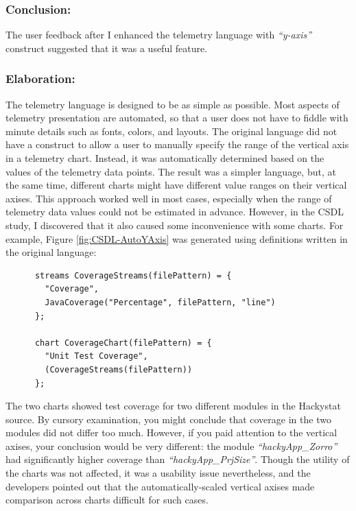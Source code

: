 \subsubsection{Conclusion:}

The user feedback after I enhanced the telemetry language with \textit{``y-axis''} construct suggested that it was a useful feature.

\subsubsection{Elaboration:}


The telemetry language is designed to be as simple as possible. Most aspects of telemetry presentation are automated, so that a user does not have to fiddle with minute details such as fonts, colors, and layouts. The original language did not have a construct to allow a user to manually specify the range of the vertical axis in a telemetry chart. Instead, it was automatically determined based on the values of the telemetry data points. The result was a simpler language, but, at the same time, different charts might have different value ranges on their vertical axises. This approach worked well in most cases, especially when the range of telemetry data values could not be estimated in advance. However, in the CSDL study, I discovered that it also caused some inconvenience with some charts. For example, Figure \ref{fig:CSDL-AutoYAxis} was generated using definitions written in the original language:

\begin{verbatim}
      streams CoverageStreams(filePattern) = {
        "Coverage",
        JavaCoverage("Percentage", filePattern, "line")
      };

      chart CoverageChart(filePattern) = {
        "Unit Test Coverage",
        (CoverageStreams(filePattern))
      };
\end{verbatim}

The two charts showed test coverage for two different modules in the Hackystat source. By cursory examination, you might conclude that coverage in the two modules did not differ too much. However, if you paid attention to the vertical axises, your conclusion would be very different: the module \textit{``hackyApp\_Zorro''} had significantly higher coverage than \textit{``hackyApp\_PrjSize''}. Though the utility of the charts was not affected, it was a usability issue nevertheless, and the developers pointed out that the automatically-scaled vertical axises made comparison across charts difficult for such cases.

